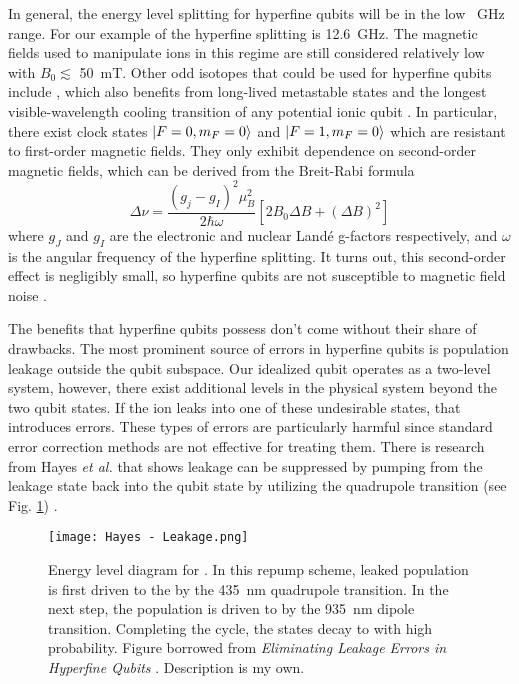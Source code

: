 In general, the energy level splitting for hyperfine qubits will be in the low \SI{}{\giga\hertz} range. For our example of  the hyperfine splitting is \SI{12.6}{\giga\hertz}. The magnetic fields used to manipulate ions in this regime are still considered relatively low with $B_0 \lesssim$ \SI{50}{\milli\tesla}. Other odd isotopes that could be used for hyperfine qubits include , which also benefits from long-lived metastable states and the longest visible-wavelength cooling transition of any potential ionic qubit \cite{Dietrich}. In particular, there exist clock states $\ket{F=0, m_F=0}$ and $\ket{F=1, m_F=0}$ which are resistant to first-order magnetic fields. They only exhibit dependence on second-order magnetic fields, which can be derived from the Breit-Rabi formula
\begin{equation}
    \Delta \nu = \frac{(g_j - g_I)^2 \mu_B^2}{2\hbar\omega} [2B_0 \Delta B + (\Delta B)^2]
\end{equation}
where $g_J$ and $g_I$ are the electronic and nuclear Land\'e g-factors respectively, and $\omega$ is the angular frequency of the hyperfine splitting. It turns out, this second-order effect is negligibly small, so hyperfine qubits are not susceptible to magnetic field noise \cite{Brown, Bruzewicz}.

The benefits that hyperfine qubits possess don't come without their share of drawbacks. The most prominent source of errors in hyperfine qubits is population leakage outside the qubit subspace. Our idealized qubit operates as a two-level system, however, there exist additional levels in the physical system beyond the two qubit states. If the ion leaks into one of these undesirable states, that introduces errors. These types of errors are particularly harmful since standard error correction methods are not effective for treating them. There is research from Hayes \textit{et al.} that shows leakage can be suppressed by pumping from the leakage state back into the qubit state by utilizing the quadrupole transition (see Fig. \ref{fig:Leakage}) \cite{Hayes}. 
\begin{figure}[ht]
    \texttt{[image: Hayes - Leakage.png]}
    \caption{Energy level diagram for . In this repump scheme, leaked population is first driven to the  by the \SI{435}{\nano\meter} quadrupole transition. In the next step, the population is driven to  by the \SI{935}{\nano\meter} dipole transition. Completing the cycle, the  states decay to  with high probability. Figure borrowed from \textit{Eliminating Leakage Errors in Hyperfine Qubits} \cite{Hayes}. Description is my own.}
    \label{fig:Leakage}
\end{figure}

